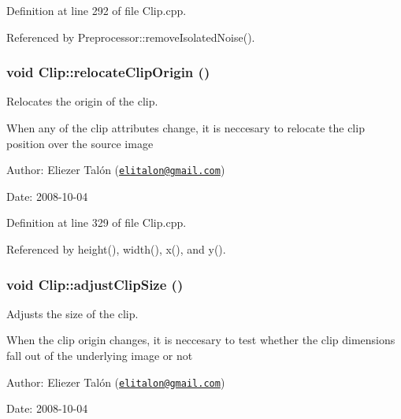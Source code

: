 Definition at line 292 of file Clip.cpp.

Referenced by Preprocessor::removeIsolatedNoise().\hypertarget{class_clip_66fc93c15de96d077d2242a53576528e}{
\subsubsection[relocateClipOrigin]{\setlength{\rightskip}{0pt plus 5cm}void Clip::relocateClipOrigin ()}}
\label{class_clip_66fc93c15de96d077d2242a53576528e}


Relocates the origin of the clip. 

When any of the clip attributes change, it is neccesary to relocate the clip position over the source image

\begin{Desc}
\item[Author:]Eliezer Talón (\href{mailto:elitalon@gmail.com}{\tt elitalon@gmail.com}) \end{Desc}
\begin{Desc}
\item[Date:]2008-10-04 \end{Desc}


Definition at line 329 of file Clip.cpp.

Referenced by height(), width(), x(), and y().\hypertarget{class_clip_e050cf90340e9160f79688627d69a00b}{
\subsubsection[adjustClipSize]{\setlength{\rightskip}{0pt plus 5cm}void Clip::adjustClipSize ()}}
\label{class_clip_e050cf90340e9160f79688627d69a00b}


Adjusts the size of the clip. 

When the clip origin changes, it is neccesary to test whether the clip dimensions fall out of the underlying image or not

\begin{Desc}
\item[Author:]Eliezer Talón (\href{mailto:elitalon@gmail.com}{\tt elitalon@gmail.com}) \end{Desc}
\begin{Desc}
\item[Date:]2008-10-04 \end{Desc}


